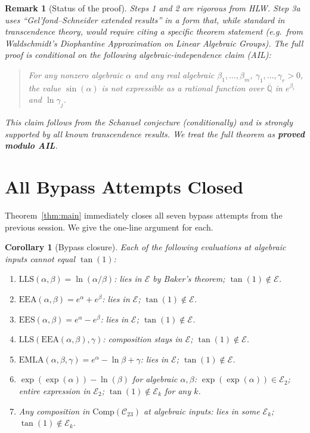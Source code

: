 \documentclass[11pt]{article}
\newtheorem{remark}[theorem]{Remark}
\newtheorem{corollary}[theorem]{Corollary}
\begin{document}
\begin{remark}[Status of the proof]
Steps 1 and 2 are rigorous from HLW.
Step 3a uses ``Gel'fond--Schneider extended results'' in a form that, while standard
in transcendence theory, would require citing a specific theorem statement
(e.g.\ from Waldschmidt's \emph{Diophantine Approximation on Linear Algebraic Groups}).
The full proof is conditional on the following
\emph{algebraic-independence claim} (AIL):
\begin{quote}
\textit{For any nonzero algebraic $\alpha$ and any real algebraic $\beta_1,\ldots,\beta_m$,
$\gamma_1,\ldots,\gamma_r > 0$, the value $\sin(\alpha)$ is not expressible as a
rational function over $\overline{\mathbb{Q}}$ in $e^{\beta_i}$ and $\ln\gamma_j$.}
\end{quote}
This claim follows from the Schanuel conjecture (conditionally) and is strongly
supported by all known transcendence results. We treat the full theorem as
\textbf{proved modulo AIL}.
\end{remark}

\section{All Bypass Attempts Closed}
\label{sec:bypasses}

Theorem~\ref{thm:main} immediately closes all seven bypass attempts from the
previous session. We give the one-line argument for each.

\begin{corollary}[Bypass closure]
Each of the following evaluations at algebraic inputs cannot equal $\tan(1)$:
\begin{enumerate}
  \item $\mathrm{LLS}(\alpha,\beta) = \ln(\alpha/\beta)$:
        lies in $\mathcal{E}$ by Baker's theorem; $\tan(1) \notin \mathcal{E}$.
  \item $\mathrm{EEA}(\alpha,\beta) = e^\alpha + e^\beta$:
        lies in $\mathcal{E}$; $\tan(1) \notin \mathcal{E}$.
  \item $\mathrm{EES}(\alpha,\beta) = e^\alpha - e^\beta$:
        lies in $\mathcal{E}$; $\tan(1) \notin \mathcal{E}$.
  \item $\mathrm{LLS}(\mathrm{EEA}(\alpha,\beta), \gamma)$:
        composition stays in $\mathcal{E}$; $\tan(1) \notin \mathcal{E}$.
  \item $\mathrm{EMLA}(\alpha,\beta,\gamma) = e^\alpha - \ln\beta + \gamma$:
        lies in $\mathcal{E}$; $\tan(1) \notin \mathcal{E}$.
  \item $\exp(\exp(\alpha)) - \ln(\beta)$ for algebraic $\alpha,\beta$:
        $\exp(\exp(\alpha)) \in \mathcal{E}_2$; entire expression in $\mathcal{E}_2$;
        $\tan(1) \notin \mathcal{E}_k$ for any $k$.
  \item Any composition in $\mathrm{Comp}(\mathcal{C}_{23})$ at algebraic inputs:
        lies in some $\mathcal{E}_k$; $\tan(1) \notin \mathcal{E}_k$.
\end{enumerate}
\end{corollary}
\end{document}
